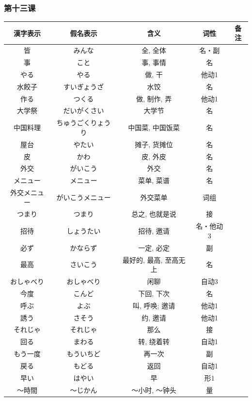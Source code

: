 \subsubsection{第十三课}
\begin{longtable}{|c|c|c|c|c|}
    \hline
漢字表示 & 假名表示  & 含义 & 词性 & 备注 \\ \hline\hline  
皆 & みんな & 全, 全体 & 名・副 & \\ \hline
事 & こと & 事, 事情 & 名 & \\ \hline
やる & やる & 做, 干 & 他动1 & \\ \hline
水餃子 & すいぎょうざ & 水饺 & 名 & \\ \hline
作る & つくる & 做, 制作, 弄 & 他动1 & \\ \hline
大学祭 & だいがくさい & 大学节 & 名 & \\ \hline
中国料理 & ちゅうごくりょうり & 中国菜, 中国饭菜 & 名 & \\ \hline
屋台 & やたい & 摊子, 货摊位 & 名 & \\ \hline
皮 & かわ & 皮, 外皮 & 名 & \\ \hline
外交 & がいこう & 外交 & 名 & \\ \hline
メニュー & メニュー & 菜单, 菜谱 & 名 & \\ \hline
外交メニュー & がいこうメニュー & 外交菜单 & 词组 & \\ \hline
つまり & つまり & 总之, 也就是说 & 接 & \\ \hline
招待 & しょうたい & 招待, 邀请 & 名・他动3 & \\ \hline
必ず & かならず & 一定, 必定 & 副 & \\ \hline
最高 & さいこう & 最好的, 最高, 至高无上 & 名 & \\ \hline
おしゃべり & おしゃべり & 闲聊 & 自动3 & \\ \hline
今度 & こんど & 下回, 下次 & 名 & \\ \hline
呼ぶ & よぶ & 叫, 呼唤; 邀请 & 他动1 & \\ \hline
誘う & さそう & 约, 邀请 & 他动1 & \\ \hline
それじゃ & それじゃ & 那么 & 接 & \\ \hline
回る & まわる & 转, 绕着转 & 自动1 & \\ \hline
もう一度 & もういちど & 再一次 & 副 & \\ \hline
戻る & もどる & 返回 & 自动1 & \\ \hline
早い & はやい & 早 & 形1 & \\ \hline
〜時間 & 〜じかん & 〜小时, 〜钟头 & 量 & \\ \hline

\end{longtable}
